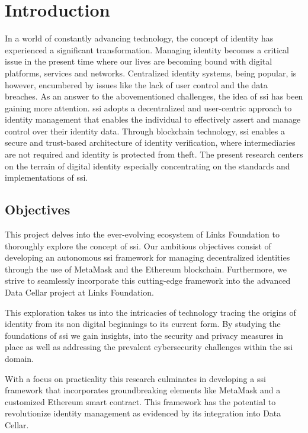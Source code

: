 \chapter{Introduction} \label{ch:introduction}

In a world of constantly advancing technology, the concept of identity has experienced a significant transformation. Managing identity becomes a critical issue in the 
present time where our lives are becoming bound with digital platforms, services and networks. Centralized identity systems, being popular, is however, encumbered by 
issues like the lack of user control and the data breaches. As an answer to the abovementioned challenges, the idea of \gls{ssi} has been gaining more attention. \gls{ssi} 
adopts a decentralized and user-centric approach to identity management that enables the individual to effectively assert and manage control over their identity data. 
Through blockchain technology, \gls{ssi} enables a secure and trust-based architecture of identity verification, where intermediaries are not required and identity is 
protected from theft. The present research centers on the terrain of digital identity especially concentrating on the standards and implementations of \gls{ssi}.

\section{Objectives} 

This project delves into the ever-evolving ecosystem of Links Foundation to thoroughly explore the concept of \gls{ssi}. Our ambitious objectives 
consist of developing an autonomous \gls{ssi} framework for managing decentralized identities through the use of MetaMask and the Ethereum blockchain. Furthermore, we strive to 
seamlessly incorporate this cutting-edge framework into the advanced Data Cellar project at Links Foundation.

This exploration takes us into the intricacies of technology tracing the origins of identity from its non digital beginnings to its current form. By studying the foundations
of \gls{ssi} we gain insights, into the security and privacy measures in place as well as addressing the prevalent cybersecurity challenges within the \gls{ssi} domain.

With a focus on practicality this research culminates in developing a \gls{ssi} framework that incorporates groundbreaking elements like MetaMask and a customized Ethereum smart 
contract. This framework has the potential to revolutionize identity management as evidenced by its integration into Data Cellar.

